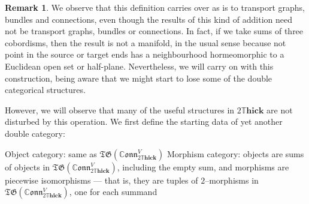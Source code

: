 \documentclass{amsart}
\newcommand{\br}[1]{\left( #1 \right)}
\newcommand{\DThick}{2\mathbb{T}\mathbf{hick}}
\newcommand{\TG}{\mathfrak{TG}}
\newcommand{\CConn}{\mathbb{C}\mathfrak{onn}}
\newcommand{\li}[1][]{\ifthenelse{\equal{#1}{}}{\item}{\item \label{#1}}}
\newenvironment{enmrt}{
  \enumerate[(i)]
  \setlength{\itemsep}{0pt}
}{
  \endenumerate
}
\numberwithin{thm}{section}
\theoremstyle{definition}
\newtheorem{rmk}[thm]{Remark}
\begin{document}
\begin{rmk}
We observe that this definition carries over as is to transport graphs, bundles
and connections, even though the results of this kind of addition need not be
transport graphs, bundles or connections. In fact, if we take sums of three
cobordisms, then the result is not a manifold, in the usual sense because not
point in the source or target ends has a neighbourhood hormeomorphic to a
Euclidean open set or half-plane. Nevertheless, we will carry on with this
construction, being aware that we might start to lose some of the double
categorical structures.
\end{rmk}

However, we will observe that many of the useful structures in $\DThick$ are not
disturbed by this operation. We first define the starting data of yet another
double category:

\begin{enmrt}
\li Object category: same as $\TG\br{\CConn^V_{\DThick}}$
\li Morphism category: objects are sums of objects in
$\TG\br{\CConn^V_{\DThick}}$, including the empty sum, and morphisms are
piecewise isomorphisms --- that is, they are tuples of $2$--morphisms in
$\TG\br{\CConn^V_{\DThick}}$, one for each summand
\end{enmrt}
\end{document}
